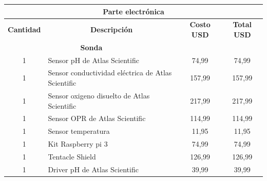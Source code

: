 \begin{appendices}
\begin{table}[t]
\begin{tabular}{clcc}
\multicolumn{4}{|c|}{\textbf{Parte electrónica}}                                                                                                                                                      \\ \hline
\multicolumn{1}{|r|}{\textbf{Cantidad}} & \multicolumn{1}{c|}{\textbf{Descripción}}                               & \multicolumn{1}{c|}{\textbf{Costo USD}} & \multicolumn{1}{c|}{\textbf{Total USD}} \\ \hline
\multicolumn{2}{|c|}{\textbf{Sonda}}                                                                              & \multicolumn{2}{c|}{}                                                             \\ \hline
\multicolumn{1}{|c|}{1}                 & \multicolumn{1}{l|}{Sensor pH de Atlas Scientific}                      & \multicolumn{1}{c|}{74,99}              & \multicolumn{1}{c|}{74,99}              \\ \hline
\multicolumn{1}{|c|}{1}                 & \multicolumn{1}{l|}{Sensor conductividad eléctrica de Atlas Scientific} & \multicolumn{1}{c|}{157,99}             & \multicolumn{1}{c|}{157,99}             \\ \hline
\multicolumn{1}{|c|}{1}                 & \multicolumn{1}{l|}{Sensor oxigeno disuelto de Atlas Scientific}        & \multicolumn{1}{c|}{217,99}             & \multicolumn{1}{c|}{217,99}             \\ \hline
\multicolumn{1}{|c|}{1}                 & \multicolumn{1}{l|}{Sensor OPR de Atlas Scientific}                     & \multicolumn{1}{c|}{114,99}             & \multicolumn{1}{c|}{114,99}             \\ \hline
\multicolumn{1}{|c|}{1}                 & \multicolumn{1}{l|}{Sensor temperatura}                                 & \multicolumn{1}{c|}{11,95}              & \multicolumn{1}{c|}{11,95}              \\ \hline
\multicolumn{1}{|c|}{1}                 & \multicolumn{1}{l|}{Kit Raspberry pi 3}                                 & \multicolumn{1}{c|}{74,99}              & \multicolumn{1}{c|}{74,99}              \\ \hline
\multicolumn{1}{|c|}{1}                 & \multicolumn{1}{l|}{Tentacle Shield}                                    & \multicolumn{1}{c|}{126,99}             & \multicolumn{1}{c|}{126,99}             \\ \hline
\multicolumn{1}{|c|}{1}                 & \multicolumn{1}{l|}{Driver pH de Atlas Scientific}                      & \multicolumn{1}{c|}{39,99}              & \multicolumn{1}{c|}{39,99}              \\ \hline

\end{tabular}
\end{table}
\end{appendices}
